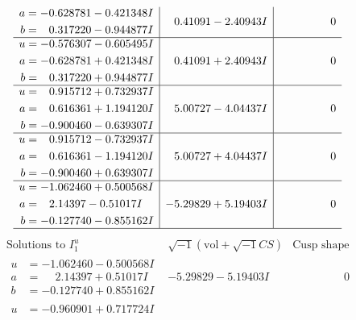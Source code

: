 \documentclass[1p]{elsarticle_modified}
\theoremstyle{definition}
\newcommand{\I}{\sqrt{-1}}
\begin{document}
$$\begin{array}{c|c|c}
\begin{aligned}
a &= -0.628781 - 0.421348 I \\
b &= \phantom{-}0.317220 - 0.944877 I\end{aligned}
 & \phantom{-}0.41091 - 2.40943 I & \phantom{-0.000000 } 0 \\ \hline\begin{aligned}
u &= -0.576307 - 0.605495 I \\
a &= -0.628781 + 0.421348 I \\
b &= \phantom{-}0.317220 + 0.944877 I\end{aligned}
 & \phantom{-}0.41091 + 2.40943 I & \phantom{-0.000000 } 0 \\ \hline\begin{aligned}
u &= \phantom{-}0.915712 + 0.732937 I \\
a &= \phantom{-}0.616361 + 1.194120 I \\
b &= -0.900460 - 0.639307 I\end{aligned}
 & \phantom{-}5.00727 - 4.04437 I & \phantom{-0.000000 } 0 \\ \hline\begin{aligned}
u &= \phantom{-}0.915712 - 0.732937 I \\
a &= \phantom{-}0.616361 - 1.194120 I \\
b &= -0.900460 + 0.639307 I\end{aligned}
 & \phantom{-}5.00727 + 4.04437 I & \phantom{-0.000000 } 0 \\ \hline\begin{aligned}
u &= -1.062460 + 0.500568 I \\
a &= \phantom{-}2.14397 - 0.51017 I \\
b &= -0.127740 - 0.855162 I\end{aligned}
 & -5.29829 + 5.19403 I & \phantom{-0.000000 } 0\\
 \hline 
 \end{array}$$\newpage$$\begin{array}{c|c|c}  
\text{Solutions to }I^u_{1}& \I (\text{vol} + \sqrt{-1}CS) & \text{Cusp shape}\\
 \hline 
\begin{aligned}
u &= -1.062460 - 0.500568 I \\
a &= \phantom{-}2.14397 + 0.51017 I \\
b &= -0.127740 + 0.855162 I\end{aligned}
 & -5.29829 - 5.19403 I & \phantom{-0.000000 } 0 \\ \hline\begin{aligned}
u &= -0.960901 + 0.717724 I \\

\end{aligned}
\end{array}$$
\end{document}
